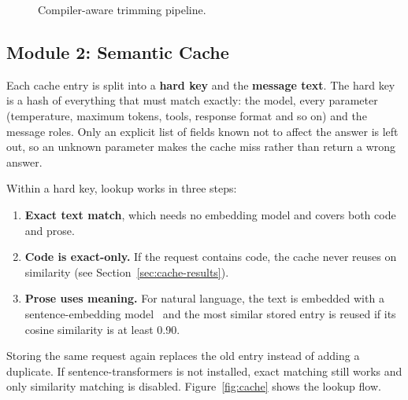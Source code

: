\documentclass[12pt, a4paper, oneside]{report}
\begin{document}
\begin{figure}[H]
\centering
{}
\caption{Compiler-aware trimming pipeline.}
\label{fig:trimmer}
\end{figure}

\subsection{Module 2: Semantic Cache}

Each cache entry is split into a \textbf{hard key} and the \textbf{message text}.
The hard key is a hash of everything that must match exactly: the model, every
parameter (temperature, maximum tokens, tools, response format and so on) and the
message roles. Only an explicit list of fields known not to affect the answer is
left out, so an unknown parameter makes the cache miss rather than return a wrong
answer.

Within a hard key, lookup works in three steps:
\begin{enumerate}
    \item \textbf{Exact text match}, which needs no embedding model and covers both
          code and prose.
    \item \textbf{Code is exact-only.} If the request contains code, the cache never
          reuses on similarity (see Section~\ref{sec:cache-results}).
    \item \textbf{Prose uses meaning.} For natural language, the text is embedded
          with a sentence-embedding model~\cite{sbert} and the most similar stored entry is reused if its cosine similarity is
          at least 0.90.
\end{enumerate}
Storing the same request again replaces the old entry instead of adding a
duplicate. If sentence-transformers is not installed, exact matching still works
and only similarity matching is disabled. Figure~\ref{fig:cache} shows the lookup
flow.
\end{document}
